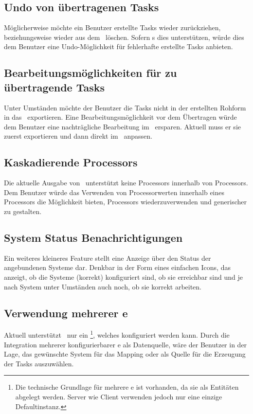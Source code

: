 		
		\subsection{Undo von übertragenen Tasks}
			Möglicherweise möchte ein Benutzer erstellte Tasks wieder zurückziehen,
			beziehungsweise wieder aus dem \ppt\ löschen.
			Sofern \ppt s dies unterstützen, würde dies dem Benutzer eine Undo-Möglichkeit für fehlerhafte erstellte Tasks anbieten.
		
		
		\subsection{Bearbeitungsmöglichkeiten für zu übertragende Tasks}
			Unter Umständen möchte der Benutzer die Tasks nicht in der erstellten Rohform in das \ppt\ exportieren.
			Eine Bearbeitungsmöglichkeit vor dem Übertragen würde dem Benutzer eine nachträgliche Bearbeitung im \ppt\ ersparen.
			Aktuell muss er sie zuerst exportieren und dann direkt im \ppt\ anpassen.
			
			
		\subsection{Kaskadierende Processors}
			Die aktuelle Ausgabe von \eeppi\ unterstützt keine Processors innerhalb von Processors.
			Dem Benutzer würde das Verwenden von Processorwerten innerhalb eines Processors die Möglichkeit bieten, Processors wiederzuverwenden und generischer zu gestalten.
			
			
		\subsection{System Status Benachrichtigungen}
			Ein weiteres kleineres Feature stellt eine Anzeige über den Status der angebundenen Systeme dar.
			Denkbar in der Form eines einfachen Icons, das anzeigt, 
			ob die Systeme (korrekt) konfiguriert sind, ob sie erreichbar sind
			und je nach System unter Umständen auch noch, ob sie korrekt arbeiten.		
		
		
	
		\subsection{Verwendung mehrerer \dks e}
			Aktuell unterstützt \eeppi\ nur ein \dks\footnote{Die technische Grundlage für mehrere \dks e ist vorhanden, da sie als Entitäten abgelegt werden. Server wie Client verwenden jedoch nur eine einzige Defaultinstanz.}, welches konfiguriert werden kann.
			Durch die Integration mehrerer konfigurierbarer \dks e als Datenquelle, wäre der Benutzer in der Lage, das gewünschte System für das Mapping oder als Quelle für die Erzeugung der Tasks auszuwählen.
		
